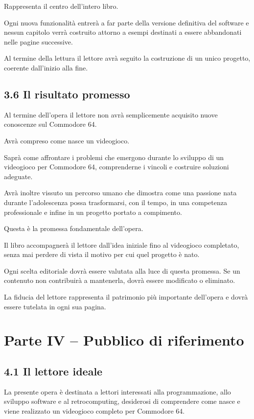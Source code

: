 \documentclass{article}
\begin{document}
Rappresenta il centro dell'intero libro.

Ogni nuova funzionalità entrerà a far parte della versione definitiva del software e nessun capitolo verrà costruito
attorno a esempi destinati a essere abbandonati nelle pagine successive.

Al termine della lettura il lettore avrà seguito la costruzione di un unico progetto, coerente dall'inizio alla fine.

\subsection{3.6 Il risultato promesso}
Al termine dell'opera il lettore non avrà semplicemente acquisito nuove conoscenze sul Commodore 64.

Avrà compreso come nasce un videogioco.

Saprà come affrontare i problemi che emergono durante lo sviluppo di un videogioco per Commodore 64, comprenderne i
vincoli e costruire soluzioni adeguate.

Avrà inoltre vissuto un percorso umano che dimostra come una passione nata durante l'adolescenza possa trasformarsi, con
il tempo, in una competenza professionale e infine in un progetto portato a compimento.

Questa è la promessa fondamentale dell'opera.

Il libro accompagnerà il lettore dall'idea iniziale fino al videogioco completato, senza mai perdere di vista il motivo
per cui quel progetto è nato.

Ogni scelta editoriale dovrà essere valutata alla luce di questa promessa. Se un contenuto non contribuirà a mantenerla,
dovrà essere modificato o eliminato.

La fiducia del lettore rappresenta il patrimonio più importante dell'opera e dovrà essere tutelata in ogni sua pagina.

\section{Parte IV – Pubblico di riferimento}
\subsection{4.1 Il lettore ideale}
La presente opera è destinata a lettori interessati alla programmazione, allo sviluppo software e al retrocomputing,
desiderosi di comprendere come nasce e viene realizzato un videogioco completo per Commodore 64.
\end{document}
